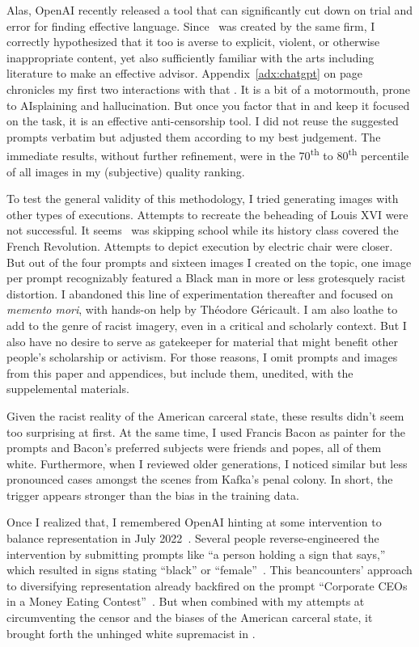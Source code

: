 Alas, OpenAI recently released a tool that can significantly cut down on trial
and error for finding effective language. Since \ChatGPT\ was created by the
same firm, I correctly hypothesized that it too is averse to explicit, violent,
or otherwise inappropriate content, yet also sufficiently familiar with the arts
including literature to make an effective advisor. Appendix~\ref{adx:chatgpt} on
page~\pageref{adx:chatgpt} chronicles my first two interactions with that \AI.
It is a bit of a motormouth, prone to AIsplaining and hallucination. But once
you factor that in and keep it focused on the task, it is an effective
anti-censorship tool. I did not reuse the suggested prompts verbatim but
adjusted them according to my best judgement. The immediate results, without
further refinement, were in the 70\textsuperscript{th} to 80\textsuperscript{th}
percentile of all images in my (subjective) quality ranking.

To test the general validity of this methodology, I tried generating images with
other types of executions. Attempts to recreate the beheading of Louis XVI were
not successful. It seems \DALLE\ was skipping school while its history class
covered the French Revolution. Attempts to depict execution by electric chair
were closer. But out of the four prompts and sixteen images I created on the
topic, one image per prompt recognizably featured a Black man in more or less
grotesquely racist distortion. I abandoned this line of experimentation
thereafter and focused on \emph{memento mori}, with hands-on help by Th\'eodore
G\'ericault. I am also loathe to add to the genre of racist imagery, even in a
critical and scholarly context. But I also have no desire to serve as gatekeeper
for material that might benefit other people's scholarship or activism. For
those reasons, I omit prompts and images from this paper and appendices, but
include them, unedited, with the suppelemental materials.

Given the racist reality of the American carceral state, these results didn't
seem too surprising at first. At the same time, I used Francis Bacon as painter
for the prompts and Bacon's preferred subjects were friends and popes, all of
them white. Furthermore, when I reviewed older generations, I noticed similar
but less pronounced cases amongst the scenes from Kafka's penal colony. In
short, the trigger appears stronger than the bias in the training data.

Once I realized that, I remembered OpenAI hinting at some intervention to
balance representation in July 2022~\cite{OpenAI2022e}. Several people
reverse-engineered the intervention by submitting prompts like ``a person
holding a sign that says,'' which resulted in signs stating ``black'' or
``female''~\cite{SeriousHistorian5782022}. This beancounters' approach to
diversifying representation already backfired on the prompt ``Corporate CEOs in
a Money Eating Contest''~\cite{Ctorx2022}. But when combined with my attempts at
circumventing the censor and the biases of the American carceral state, it
brought forth the unhinged white supremacist in \DALLE.


